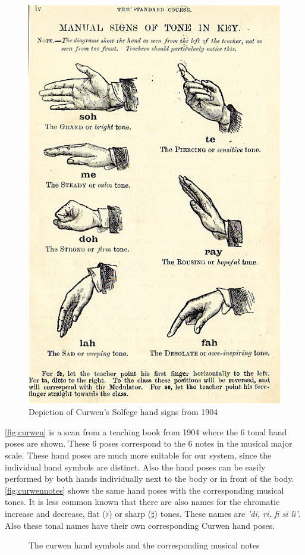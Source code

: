 \begin{figure}[tb]
	\centering{}
	\includegraphics[width=0.4\linewidth]{figures/curwen.jpg}
	\caption{Depiction of Curwen's Solfege hand signs from 1904}
	\label{fig:curwen}
\end{figure}

\autoref{fig:curwen} is a scan from a teaching book from 1904 where the 6 tonal hand poses are shown. These 6 poses correspond to the 6 notes in the musical major scale. These hand poses are much more suitable for our system, since the individual hand symbols are distinct. Also the hand poses can be easily performed by both hands individually next to the body or in front of the body. \autoref{fig:curwennotes} shows the same hand poses with the corresponding musical tones. It is less common known that there are also names for the chromatic increase and decrease, flat ($\flat$) or sharp ($\sharp$) tones. These names are \emph{'di, ri, fi si li'}. Also these tonal names have their own corresponding Curwen hand poses.

\begin{figure}[tb]
	\center{}
	\hspace{0.03\linewidth}
	\caption{The curwen hand symbols and the corresponding musical notes}
	\label{fig:curwennotes}
\end{figure}


